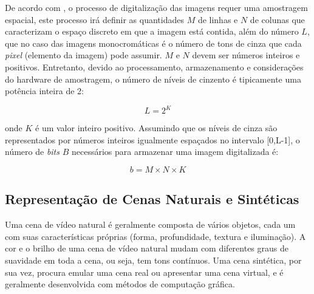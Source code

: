 	De acordo com , o processo de digitalização das imagens requer uma amostragem espacial, este processo irá definir as quantidades $M$ de linhas e $N$ de colunas que caracterizam o espaço discreto em que a imagem está contida, além do número $L$, que no caso das imagens monocromáticas é o número de tons de cinza que cada \textit{pixel} (elemento da imagem) pode assumir. $M$ e $N$ devem ser números inteiros e positivos. Entretanto, devido ao processamento, armazenamento e considerações do hardware de amostragem, o número de níveis de cinzento é tipicamente uma potência inteira de 2:
\vspace{-1cm}
\begin{center}
	\begin{equation}
		L = 2^K
	\end{equation}
\end{center}	 
\noindent onde $K$ é um valor inteiro positivo. Assumindo que os níveis de cinza são representados por números inteiros igualmente espaçados no intervalo [0,L-1], o número de \textit{bits} $B$ necessários para armazenar uma imagem digitalizada é:

\begin{equation}
	b = M \times N \times K
\end{equation}

\subsection{Representação de Cenas Naturais e Sintéticas}

Uma cena de vídeo natural é geralmente composta de vários objetos, cada um com suas características próprias (forma, profundidade, textura e iluminação). A cor e o brilho de uma cena de vídeo natural mudam com diferentes graus de suavidade em toda a cena, ou seja, tem tons contínuos. Uma cena sintética, por sua vez, procura emular uma cena real ou apresentar uma cena virtual, e é geralmente desenvolvida com métodos de computação gráfica.\cite{scharstein2002taxonomy}

